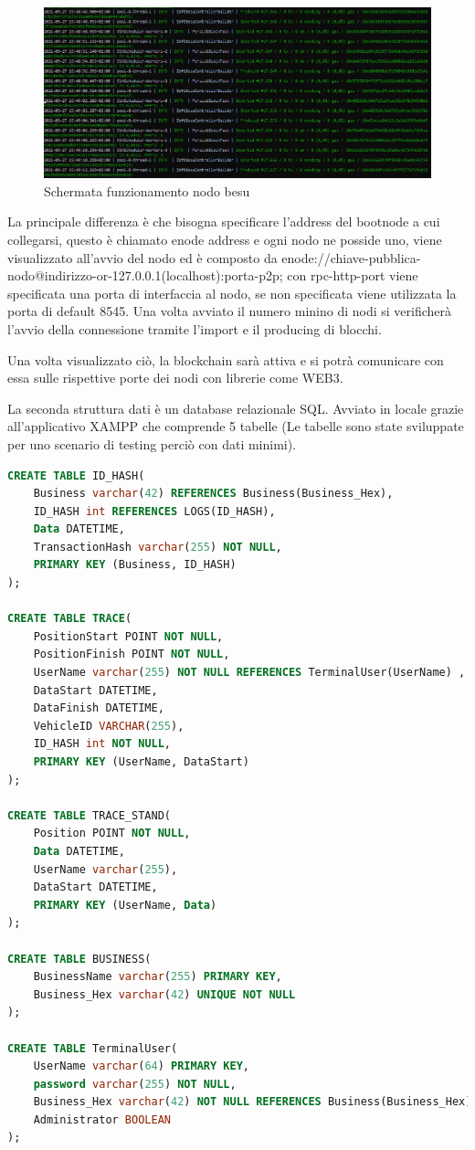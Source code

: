 \documentclass[11pt,a4paper,titlepage,twoside,openright]{report}
\begin{document}
\begin{figure}[h]
	\includegraphics[width=\textwidth]{Besu-imported-produced}
	\centering
	\caption{Schermata funzionamento nodo besu}
	\label{fig:besu-imported-produced}
\end{figure}

La principale differenza è che bisogna specificare l'address del bootnode a cui collegarsi, questo è chiamato enode address e ogni nodo ne posside uno, viene visualizzato all'avvio del nodo ed è composto da 
enode://chiave-pubblica-nodo@indirizzo-or-127.0.0.1(localhost):porta-p2p; con rpc-http-port viene specificata una porta di interfaccia al nodo, se non specificata viene utilizzata la porta di default 8545. Una volta avviato il numero minino di nodi si verificherà l'avvio della connessione tramite l'import e il producing di blocchi.

Una volta visualizzato ciò, la blockchain sarà attiva e si potrà comunicare con essa sulle rispettive porte dei nodi con librerie come WEB3.

La seconda struttura dati è un database relazionale SQL. Avviato in locale grazie all'applicativo XAMPP che comprende 5 tabelle (Le tabelle sono state sviluppate per uno scenario di testing perciò con dati minimi).
\begin{lstlisting}[language=SQL]
CREATE TABLE ID_HASH(
	Business varchar(42) REFERENCES Business(Business_Hex),
	ID_HASH int REFERENCES LOGS(ID_HASH),
	Data DATETIME,
	TransactionHash varchar(255) NOT NULL,
	PRIMARY KEY (Business, ID_HASH)
);

CREATE TABLE TRACE(
	PositionStart POINT NOT NULL,
	PositionFinish POINT NOT NULL,
	UserName varchar(255) NOT NULL REFERENCES TerminalUser(UserName) ,
	DataStart DATETIME,
	DataFinish DATETIME,
	VehicleID VARCHAR(255),
	ID_HASH int NOT NULL,
	PRIMARY KEY (UserName, DataStart)
);

CREATE TABLE TRACE_STAND(
	Position POINT NOT NULL,
	Data DATETIME,
	UserName varchar(255),
	DataStart DATETIME,
	PRIMARY KEY (UserName, Data)
);

CREATE TABLE BUSINESS(
	BusinessName varchar(255) PRIMARY KEY,
	Business_Hex varchar(42) UNIQUE NOT NULL
);

CREATE TABLE TerminalUser(
	UserName varchar(64) PRIMARY KEY,
	password varchar(255) NOT NULL,
	Business_Hex varchar(42) NOT NULL REFERENCES Business(Business_Hex),
	Administrator BOOLEAN
);
\end{lstlisting}
\end{document}
